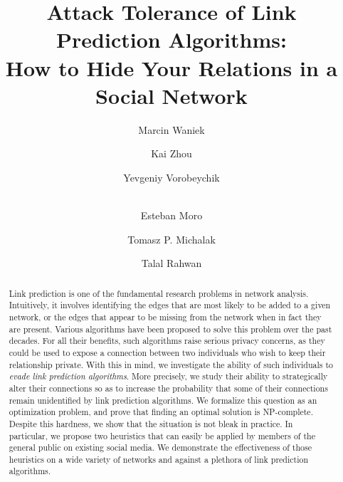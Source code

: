 \documentclass[twocolumn]{article}
\begin{document}
\title{Attack Tolerance of Link Prediction Algorithms:\\ How to Hide Your Relations in a Social Network}

\author[a,b]{Marcin Waniek}
\author[c]{Kai Zhou}
\author[c]{Yevgeniy Vorobeychik}
\author[d,e]{\\Esteban Moro}
\author[b,*]{Tomasz P. Michalak}
\author[a,*]{Talal Rahwan}

\renewcommand*{\Affilfont}{\normalsize}


\date{}

\maketitle

\begin{abstract}
Link prediction is one of the fundamental research problems in network analysis.
Intuitively, it involves identifying the edges that are most likely to be added to a given network, or the edges that appear to be missing from the network when in fact they are present. Various algorithms have been proposed to solve this problem  over the past decades. For all their benefits, such algorithms raise serious privacy concerns, as they could be used to expose a connection between two individuals who wish to keep their relationship private. With this in mind, we investigate the ability of such individuals to \emph{evade link prediction algorithms}. More precisely, we study their ability to strategically alter their connections so as to increase the probability that some of their connections remain unidentified by link prediction algorithms. We formalize this question as an optimization problem, and prove that finding an optimal solution is NP-complete. Despite this hardness, we show that the situation is not bleak in practice. In particular, we propose two heuristics that can easily be applied by members of the general public on existing social media. We demonstrate the effectiveness of those heuristics on a wide variety of networks and against a plethora of link prediction algorithms.
\end{abstract}
\end{document}
